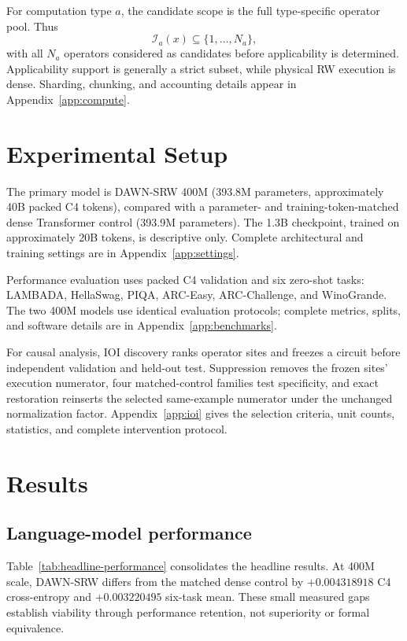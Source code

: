 \documentclass{article}
\newcommand{\DAWN}{DAWN-SRW}
\begin{document}
For computation type \(a\), the candidate scope is the full type-specific
operator pool. Thus
\[
\mathcal{I}_a(x)\subseteq\{1,\ldots,N_a\},
\]
with all \(N_a\) operators considered as candidates before applicability is
determined. Applicability support is generally a strict subset, while physical
RW execution is dense. Sharding, chunking, and accounting details appear in
Appendix~\ref{app:compute}.

\section{Experimental Setup}
\label{sec:setup}
\label{sec:protocol}

The primary model is \DAWN{} 400M (393.8M parameters, approximately 40B packed
C4 tokens), compared with a parameter- and training-token-matched dense
Transformer control (393.9M parameters). The 1.3B checkpoint, trained on approximately 20B
tokens, is descriptive only. Complete
architectural and training settings are in Appendix~\ref{app:settings}.

Performance evaluation uses packed C4 validation and six zero-shot tasks:
LAMBADA, HellaSwag, PIQA, ARC-Easy, ARC-Challenge, and WinoGrande. The two 400M
models use identical evaluation protocols; complete metrics, splits, and software
details are in Appendix~\ref{app:benchmarks}.

For causal analysis, IOI discovery ranks operator sites and freezes a circuit
before independent validation and held-out test. Suppression removes the frozen
sites' execution numerator, four matched-control families test specificity, and
exact restoration reinserts the selected same-example numerator under the
unchanged normalization factor. Appendix~\ref{app:ioi} gives the selection criteria, unit
counts, statistics, and complete intervention protocol.

\section{Results}
\label{sec:results}

\subsection{Language-model performance}

Table~\ref{tab:headline-performance} consolidates the headline results. At
400M scale, \DAWN{} differs from the matched dense control by
\(+0.004318918\) C4 cross-entropy and \(+0.003220495\) six-task mean. These
small measured gaps establish viability through performance retention, not
superiority or formal equivalence.
\end{document}
